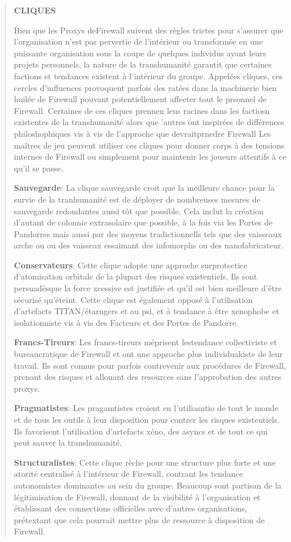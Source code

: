 \begin{quotation} \begin{large} \textbf{CLIQUES} \end{large} 

Bien que les Proxys deFirewall suivent des règles trictes pour s'assurer que l'organisation n'est pas pervertie de l'intérieur ou transformée en une puissante organisation sous la coupe de quelques individus ayant leurs projets personnels, la nature de la transhumanité garantit que certaines factions et tendances existent à l'intérieur du groupe. Appelées cliques, ces cercles d'influences provoquent parfois des ratées dans la machinerie bien huilée de Firewall pouvant potentiellement affecter tout le prsonnel de Firewall. Certaines de ces cliques prennen leus racines dans les factiosn existentes de la transhumanité alors que 'autres ont inspirées de différences philoshophiques vis à vis de l'approche que devraitprnedre Firewall Les maîtres de jeu peuvent utiliser ces cliques pour donner corps à des tensions internes de Firewall ou simplement pour maintenir les joueurs attentifs à ce qu'il se passe. 

\textbf{Sauvegarde}: La clique sauvegarde croit que la meilleure chance pour la survie de la tranhumanité est de déployer de nombreuses mesures de sauvegarde redondantes aussi tôt que possible. Cela inclut la création d'autant de colonnie extrasolaire que possible, à la fois via les Portes de Pandorres mais aussi par des moyens tradictionnells tels que des vaisseaux arche ou ou des vaisseax essaimant des infomorphs ou des nanofabricateur. 

\textbf{Conservateurs}: Cette clique adopte une approche surprotectice d'atomisation orbitale de la plupart des risques existentiels. Ils sont persuadésque la force xcessive est justifiée et qu'il est bien meilleure d'être sécurisé qu'éteint. Cette clique est également opposé à l'utilisation d'artefacts TITAN/étarngers et au psi, et à tendance à être xenophobe et isolationniste vis à vis des Facteurs et des Portes de Pandorre. 

\textbf{Francs-Tireurs}: Les francs-tireurs méprisent lestendance collectiviste et bureaucratique de Firewall et ont une approche plus individuakiste de leur travail. Ils sont connus pour parfois contrevenir aux procédures de Firewall, prenant des risques et allouant des resources sans l'approbation des autres proxys. 

\textbf{Pragmatistes}: Les pragamtistes croient en l'utiliasntio de tout le monde et de tous les outils à leur disposition pour contrer les risques existentiels. Ils favorisent l'utilisation d'artefacts xéno, des asyncs et de tout ce qui peut sauver la transhumanité. 

\textbf{Structuralistes}: Cette clique rèche pour une structure plus forte et une atorité centralisé à l'intérieur de Firewall, contrant les tendance autonomistes dominantes au sein du groupe. Beaucoup sont partisan de la légitimisation de Firewall, donnant de la visibilité à l'organisation et établissant des connections officielles avec d'autres organisations, prétextant que cela pourrait mettre plus de ressource à disposition de Firewall. \end{quotation} 
